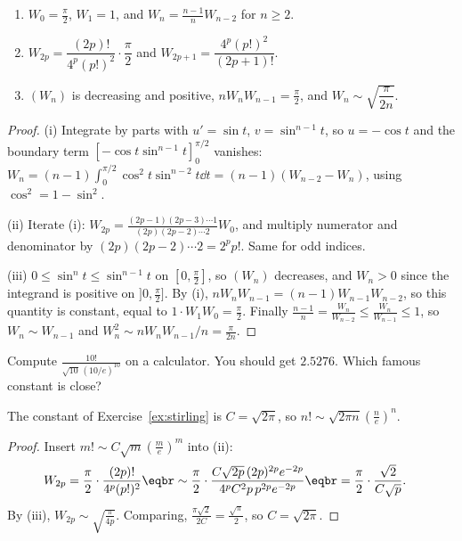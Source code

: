 \begin{proposition}\label{prop:wallis}
\begin{enumerate}[label=(\roman*)]
\item $W_0=\frac\pi2$, $W_1=1$, and $W_n=\frac{n-1}nW_{n-2}$ for $n\ge2$.
\item $W_{2p}=\dfrac{(2p)!}{4^p(p!)^2}\cdot\dfrac\pi2$ and $W_{2p+1}=\dfrac{4^p(p!)^2}{(2p+1)!}$.
\item $(W_n)$ is decreasing and positive, $nW_nW_{n-1}=\frac\pi2$, and $W_n\sim\sqrt{\dfrac\pi{2n}}$.
\end{enumerate}
\end{proposition}
\begin{proof}
(i) Integrate by parts with $u'=\sin t$, $v=\sin^{n-1}t$, so $u=-\cos t$ and the boundary term $[-\cos t\sin^{n-1}t]_0^{\pi/2}$ vanishes:
$W_n=(n-1)\int_0^{\pi/2}\cos^2t\sin^{n-2}t\dd t=(n-1)(W_{n-2}-W_n)$, using $\cos^2=1-\sin^2$.

(ii) Iterate (i): $W_{2p}=\frac{(2p-1)(2p-3)\cdots1}{(2p)(2p-2)\cdots2}W_0$, and multiply numerator and denominator by $(2p)(2p-2)\cdots2=2^pp!$. Same for odd indices.

(iii) $0\le\sin^{n}t\le\sin^{n-1}t$ on $\left[0,\frac\pi2\right]$, so $(W_n)$ decreases, and $W_n>0$ since the integrand is positive on $]0,\frac\pi2]$. By (i), $nW_nW_{n-1}=(n-1)W_{n-1}W_{n-2}$, so this quantity is constant, equal to $1\cdot W_1W_0=\frac\pi2$.
Finally $\frac{n-1}n=\frac{W_n}{W_{n-2}}\le\frac{W_n}{W_{n-1}}\le1$, so $W_n\sim W_{n-1}$ and $W_n^2\sim nW_nW_{n-1}/n=\frac\pi{2n}$.
\end{proof}

\begin{think}
Compute $\frac{10!}{\sqrt{10}\,(10/e)^{10}}$ on a calculator. You should get $2.5276$. Which famous constant is close?
\end{think}

\begin{theorem}\label{thm:stirlingC}
The constant of Exercise~\ref{ex:stirling} is $C=\sqrt{2\pi}$, so $n!\sim\sqrt{2\pi n}\left(\frac ne\right)^n$.
\end{theorem}
\begin{proof}
Insert $m!\sim C\sqrt m\left(\frac me\right)^m$ into (ii):
\[
\begin{aligned}W_{2p}&=\frac\pi2\cdot\frac{(2p)!}{4^p(p!)^2}\eqbr\sim\frac\pi2\cdot\frac{C\sqrt{2p}\,(2p)^{2p}e^{-2p}}{4^pC^2p\,p^{2p}e^{-2p}}\eqbr=\frac\pi2\cdot\frac{\sqrt2}{C\sqrt p}.\end{aligned}
\]
By (iii), $W_{2p}\sim\sqrt{\frac\pi{4p}}$. Comparing, $\frac{\pi\sqrt2}{2C}=\frac{\sqrt\pi}2$, so $C=\sqrt{2\pi}$.
\end{proof}

